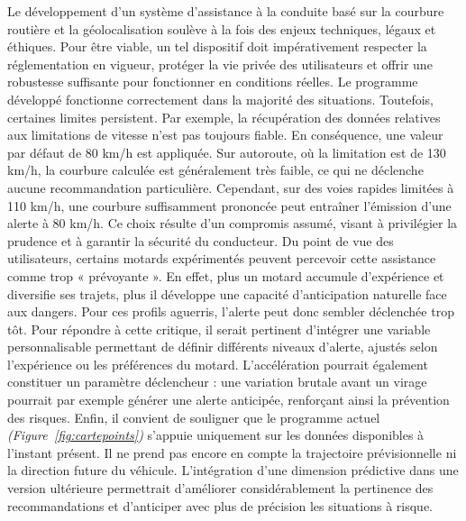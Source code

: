 Le développement d’un système d’assistance à la conduite basé sur la courbure routière et la géolocalisation soulève à la fois des enjeux techniques, légaux et éthiques. Pour être viable, un tel dispositif doit impérativement respecter la réglementation en vigueur, protéger la vie privée des utilisateurs et offrir une robustesse suffisante pour fonctionner en conditions réelles.
Le programme développé fonctionne correctement dans la majorité des situations. Toutefois, certaines limites persistent. Par exemple, la récupération des données relatives aux limitations de vitesse n’est pas toujours fiable. En conséquence, une valeur par défaut de 80 km/h est appliquée. Sur autoroute, où la limitation est de 130 km/h, la courbure calculée est généralement très faible, ce qui ne déclenche aucune recommandation particulière. Cependant, sur des voies rapides limitées à 110 km/h, une courbure suffisamment prononcée peut entraîner l’émission d’une alerte à 80 km/h. Ce choix résulte d’un compromis assumé, visant à privilégier la prudence et à garantir la sécurité du conducteur.
Du point de vue des utilisateurs, certains motards expérimentés peuvent percevoir cette assistance comme trop « prévoyante ». En effet, plus un motard accumule d’expérience et diversifie ses trajets, plus il développe une capacité d’anticipation naturelle face aux dangers. Pour ces profils aguerris, l’alerte peut donc sembler déclenchée trop tôt.
Pour répondre à cette critique, il serait pertinent d’intégrer une variable personnalisable permettant de définir différents niveaux d’alerte, ajustés selon l’expérience ou les préférences du motard. L’accélération pourrait également constituer un paramètre déclencheur : une variation brutale avant un virage pourrait par exemple générer une alerte anticipée, renforçant ainsi la prévention des risques.
Enfin, il convient de souligner que le programme actuel \emph{(Figure~\ref{fig:cartepoints})} s’appuie uniquement sur les données disponibles à l’instant présent. Il ne prend pas encore en compte la trajectoire prévisionnelle ni la direction future du véhicule. L’intégration d’une dimension prédictive dans une version ultérieure permettrait d’améliorer considérablement la pertinence des recommandations et d’anticiper avec plus de précision les situations à risque.